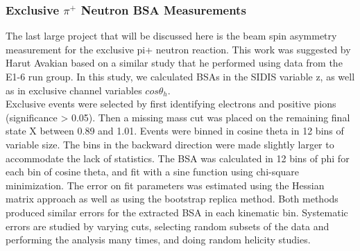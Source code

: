 
\subsubsection{Exclusive $\pi^+$ Neutron BSA Measurements}
The last large project that will be discussed here is the beam spin asymmetry measurement for the exclusive pi+ neutron reaction.  This work was suggested by Harut Avakian based on a similar study that he performed using data from the E1-6 run group.  In this study, we calculated BSAs in the SIDIS variable z, as well as in exclusive channel variables $cos\theta_h$.  \\

Exclusive events were selected by first identifying electrons and positive pions (significance > 0.05).  Then a missing mass cut was placed on the remaining final state X between 0.89 and 1.01.  Events were binned in cosine theta in 12 bins of variable size.  The bins in the backward direction were made slightly larger to accommodate the lack of statistics.  The BSA was calculated in 12 bins of phi for each bin of cosine theta, and fit with a sine function using chi-square minimization.  The error on fit parameters was estimated using the Hessian matrix approach as well as using the bootstrap replica method.  Both methods produced similar errors for the extracted BSA in each kinematic bin.  Systematic errors are studied by varying cuts, selecting random subsets of the data and performing the analysis many times, and doing random helicity studies.  \\

